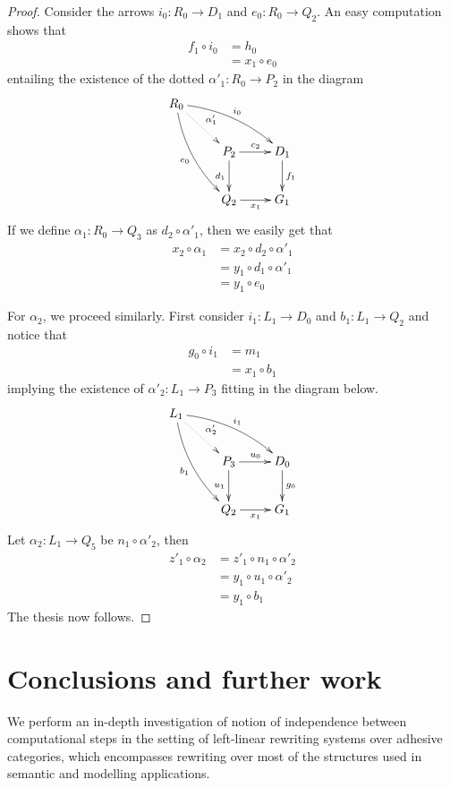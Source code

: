 \documentclass[a4paper,UKenglish,cleveref,pdftex,thm-restate,numberwithinsect,anonymous]{lipics}
\begin{document}
\begin{proof}
		Consider the arrows $i_0\colon R_0\to D_1$ and $e_0\colon R_0\to Q_2$. An easy computation shows that
		\begin{align*}
			f_1\circ i_0 & = h_0 \\&=x_1\circ e_0
		\end{align*}
		entailing the existence of  the dotted $\alpha'_1\colon R_0\to P_2$ in the diagram
		\[\xymatrix{R_0 \ar@{.>}[dr]^{\alpha'_1} \ar@/^.3cm/[drr]^{i_0} \ar@/_.3cm/[ddr]_{e_0}\\ &P_2 \ar[r]^{c_2} \ar[d]_{d_1}& D_1 \ar[d]^{f_1}\\ &Q_2\ar[r]_{x_1} & G_1}\]
		If we define $\alpha_1\colon R_0\to Q_3$ as $d_2\circ \alpha'_1$, then we easily get that
		\begin{align*}
			x_2\circ \alpha_1 & =x_2\circ d_2\circ \alpha'_1 \\&= y_1\circ d_1\circ \alpha'_1\\&=y_1\circ e_0
		\end{align*}

		For $\alpha_2$, we proceed similarly. First consider  $i_1\colon L_1\to D_0$ and $b_1\colon L_1 \to Q_2$ and notice that
		\begin{align*}
			g_0\circ i_1 & = m_1 \\&= x_1 \circ b_1
		\end{align*}
		implying the existence of $\alpha'_2\colon L_1\to P_3$ fitting in the diagram below.
		\[\xymatrix{L_1 \ar@{.>}[dr]^{\alpha'_2} \ar@/^.3cm/[drr]^{i_1} \ar@/_.3cm/[ddr]_{b_1}\\ &P_3 \ar[r]^{u_0} \ar[d]_{u_1}& D_0 \ar[d]^{g_0}\\ &Q_2\ar[r]_{x_1} & G_1}\]
		Let $\alpha_2\colon L_1\to Q_5$ be $n_1\circ \alpha'_2$, then
		\begin{align*}
			z'_1 \circ \alpha_2 & = z'_1 \circ n_1\circ \alpha'_2 \\&=y_1\circ u_1\circ \alpha'_2\\&=y_1\circ b_1
		\end{align*}
		The thesis now follows.
	\end{proof}
\fi





\section{Conclusions and further work}

We perform an in-depth investigation of notion of independence between
computational steps in the setting of left-linear rewriting systems
over adhesive categories, which encompasses rewriting over most of the
structures used in semantic and modelling applications.
\end{document}
